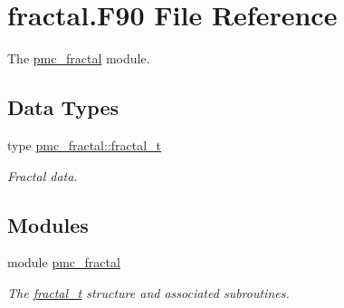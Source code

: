 \hypertarget{fractal_8_f90}{}\section{fractal.\+F90 File Reference}
\label{fractal_8_f90}


The \mbox{\hyperlink{namespacepmc__fractal}{pmc\+\_\+fractal}} module.  


\subsection*{Data Types}
\begin{DoxyCompactItemize}
\item 
type \mbox{\hyperlink{structpmc__fractal_1_1fractal__t}{pmc\+\_\+fractal\+::fractal\+\_\+t}}
\begin{DoxyCompactList}\small\item\em Fractal data. \end{DoxyCompactList}\end{DoxyCompactItemize}
\subsection*{Modules}
\begin{DoxyCompactItemize}
\item 
module \mbox{\hyperlink{namespacepmc__fractal}{pmc\+\_\+fractal}}
\begin{DoxyCompactList}\small\item\em The \mbox{\hyperlink{structpmc__fractal_1_1fractal__t}{fractal\+\_\+t}} structure and associated subroutines. \end{DoxyCompactList}\end{DoxyCompactItemize}

